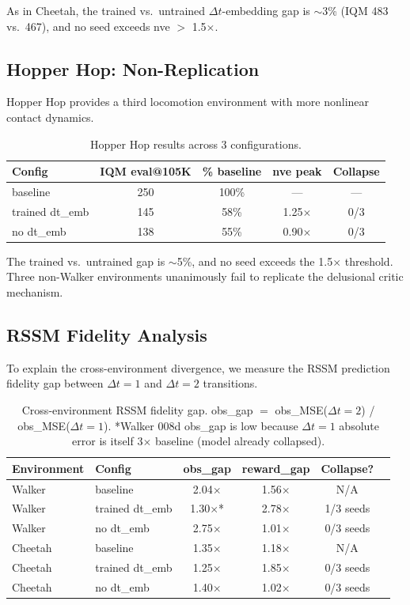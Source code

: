 \documentclass[10pt,letterpaper]{article}
\begin{document}
As in Cheetah, the trained vs.\ untrained $\Delta t$-embedding gap is $\sim$3\% (IQM 483 vs.\ 467), and no seed exceeds nve $>$ 1.5$\times$.

\subsection{Hopper Hop: Non-Replication}
\label{sec:hopper}

Hopper Hop provides a third locomotion environment with more nonlinear contact dynamics.

\begin{table}[h]
\centering
\caption{Hopper Hop results across 3 configurations.}
\label{tab:hopper}
\begin{tabular}{lcccc}
\toprule
Config & IQM eval@105K & \% baseline & nve peak & Collapse \\
\midrule
baseline & 250 & 100\% & --- & --- \\
trained dt\_emb & 145 & 58\% & 1.25$\times$ & 0/3 \\
no dt\_emb & 138 & 55\% & 0.90$\times$ & 0/3 \\
\bottomrule
\end{tabular}
\end{table}

The trained vs.\ untrained gap is $\sim$5\%, and no seed exceeds the 1.5$\times$ threshold. Three non-Walker environments unanimously fail to replicate the delusional critic mechanism.

\subsection{RSSM Fidelity Analysis}
\label{sec:rssm}

To explain the cross-environment divergence, we measure the RSSM prediction fidelity gap between $\Delta t{=}1$ and $\Delta t{=}2$ transitions.

\begin{table}[h]
\centering
\caption{Cross-environment RSSM fidelity gap. obs\_gap $=$ obs\_MSE($\Delta t{=}2$) / obs\_MSE($\Delta t{=}1$). *Walker 008d obs\_gap is low because $\Delta t{=}1$ absolute error is itself 3$\times$ baseline (model already collapsed).}
\label{tab:rssm-fidelity}
\begin{tabular}{llcccc}
\toprule
Environment & Config & obs\_gap & reward\_gap & Collapse? \\
\midrule
Walker & baseline & 2.04$\times$ & 1.56$\times$ & N/A \\
Walker & trained dt\_emb & 1.30$\times$* & 2.78$\times$ & 1/3 seeds \\
Walker & no dt\_emb & 2.75$\times$ & 1.01$\times$ & 0/3 seeds \\
Cheetah & baseline & 1.35$\times$ & 1.18$\times$ & N/A \\
Cheetah & trained dt\_emb & 1.25$\times$ & 1.85$\times$ & 0/3 seeds \\
Cheetah & no dt\_emb & 1.40$\times$ & 1.02$\times$ & 0/3 seeds \\
\bottomrule
\end{tabular}
\end{table}
\end{document}
